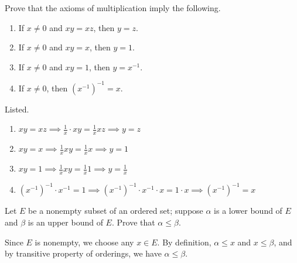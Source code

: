 \documentclass{article}
\begin{document}
    \begin{exercise}[Rudin 1.3]
    Prove that the axioms of multiplication imply the following. 
    \begin{enumerate}
        \item If $x \neq 0$ and $xy = xz$, then $y = z$. 
        \item If $x \neq 0$ and $xy = x$, then $y = 1$. 
        \item If $x \neq 0$ and $xy = 1$, then $y = x^{-1}$. 
        \item If $x \neq 0$, then $(x^{-1})^{-1} = x$. 
    \end{enumerate}
    \end{exercise}
    \begin{solution}
    Listed. 
    \begin{enumerate}
        \item $xy = xz \implies \frac{1}{x} \cdot x y = \frac{1}{x} x z \implies y = z$ 
        \item $x y = x \implies \frac{1}{x} x y = \frac{1}{x} x \implies y = 1$ 
        \item $x y = 1 \implies \frac{1}{x} x y = \frac{1}{x} 1 \implies y = \frac{1}{x}$ 
        \item $(x^{-1})^{-1} \cdot x^{-1} = 1 \implies (x^{-1})^{-1} \cdot x^{-1} \cdot x = 1 \cdot x \implies (x^{-1})^{-1} = x$
    \end{enumerate}
    \end{solution}

    \begin{exercise}[Rudin 1.4]
    Let $E$ be a nonempty subset of an ordered set; suppose $\alpha$ is a lower bound of $E$ and $\beta$ is an upper bound of $E$. Prove that $\alpha \leq \beta$. 
    \end{exercise}
    \begin{solution}
    Since $E$ is nonempty, we choose any $x \in E$. By definition, $\alpha \leq x$ and $x \leq \beta$, and by transitive property of orderings, we have $\alpha \leq \beta$. 
    \end{solution}
\end{document}
